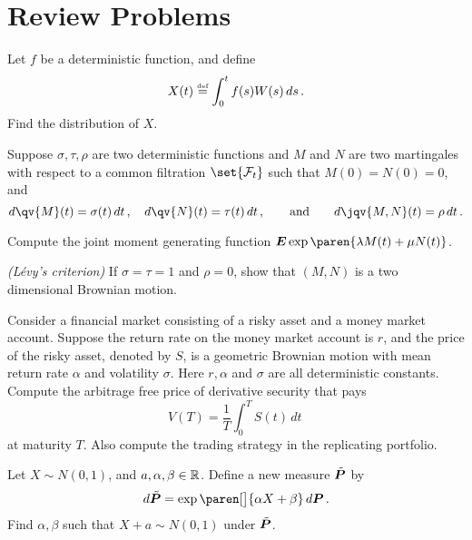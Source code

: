 \section{Review Problems}

\begin{problem}
  Let $f$ be a deterministic function, and define
  \begin{equation*}
    X(t) \defeq \int_0^t f(s) W(s) \, ds\,.
  \end{equation*}
  Find the distribution of $X$.
\end{problem}

\begin{problem}
  Suppose $\sigma, \tau, \rho$ are two deterministic functions and $M$ and $N$ are two martingales with respect to a common filtration $\set{\mathcal F_t}$ such that  $M(0) = N(0) = 0$, and
  \begin{equation*}
    d\qv{M}(t) = \sigma(t) \, dt\,,
    \quad
    d\qv{N}(t) = \tau(t) \, dt\,,
    \qquad\text{and}\qquad
    d\jqv{M,N}(t) = \rho \, dt\,.
  \end{equation*}
  \vspace{-\baselineskip}
  \begin{parts}
    \item
      Compute the joint moment generating function $\E \exp\paren{\lambda M(t) + \mu N(t)}$.
    \item
      \emph{(L\'evy's criterion)}
      If $\sigma = \tau = 1$ and $\rho = 0$, show that $(M, N)$ is a two dimensional Brownian motion.
  \end{parts}
\end{problem}

\begin{problem}
  Consider a financial market consisting of a risky asset and a money market account.
  Suppose the return rate on the money market account is $r$, and the price of the risky asset, denoted by $S$, is a geometric Brownian motion with mean return rate $\alpha$ and volatility $\sigma$.
  Here $r, \alpha$ and $\sigma$ are all deterministic constants.
  Compute the arbitrage free price of derivative security that pays
  \begin{equation*}
    V(T) = \frac{1}{T} \int_0^T S(t) \, dt\,
  \end{equation*}
  at maturity $T$.
  Also compute the trading strategy in the replicating portfolio.
\end{problem}

\begin{problem}
  Let $X \sim N(0, 1)$, and $a, \alpha, \beta \in \R$.
  Define a new measure $\tilde\P$ by
  \begin{equation*}
    d\tilde\P = \exp\paren[\big]{ \alpha X + \beta } \, d\P\,.
  \end{equation*}
  Find $\alpha,\beta$ such that $X + a \sim N(0, 1)$ under $\tilde\P$.
\end{problem}


